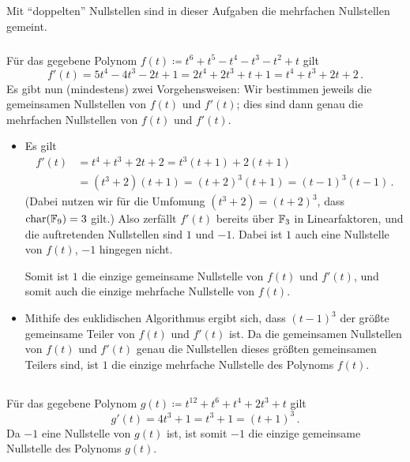 \subsection{}

Mit \enquote{doppelten} Nullstellen sind in dieser Aufgaben die mehrfachen Nullstellen gemeint.



\subsubsection{}

Für das gegebene Polynom $f(t) \coloneqq t^6 + t^5 - t^4 - t^3 - t^2 + t$ gilt
\[
    f'(t)
  = 5 t^4 - 4 t^3 - 2 t + 1
  = 2 t^4 + 2 t^3 + t + 1
  = t^4 + t^3 + 2 t + 2 \,.
\]
Es gibt nun (mindestens) zwei Vorgehensweisen:
Wir bestimmen jeweils die gemeinsamen Nullstellen von $f(t)$ und $f'(t)$;
dies sind dann genau die mehrfachen Nullstellen von $f(t)$ und $f'(t)$.

\begin{itemize}
  \item
    Es gilt
    \begin{align*}
          f'(t)
      &=  t^4 + t^3 + 2 t + 2
       =  t^3 (t+1) + 2 (t+1) \\
      &=  (t^3 + 2)(t + 1)
       =  (t + 2)^3 (t + 1)
       =  (t - 1)^3 (t - 1) \,.
    \end{align*}
    (Dabei nutzen wir für die Umfomung $(t^3 + 2) = (t+2)^3$, dass $\operatorname{char}(\mathbb{F}_{9}) = 3$ gilt.)
    Also zerfällt $f'(t)$ bereits über $\mathbb{F}_{3}$ in Linearfaktoren, und die auftretenden Nullstellen sind $1$ und $-1$.
    Dabei ist $1$ auch eine Nullstelle von $f(t)$, $-1$ hingegen nicht.
    
    Somit ist $1$ die einzige gemeinsame Nullstelle von $f(t)$ und $f'(t)$, und somit auch die einzige mehrfache Nullstelle von $f(t)$.
  \item
    Mithife des euklidischen Algorithmus ergibt sich, dass $(t-1)^3$ der größte gemeinsame Teiler von $f(t)$ und $f'(t)$ ist.
    Da die gemeinsamen Nullstellen von $f(t)$ und $f'(t)$ genau die Nullstellen dieses größten gemeinsamen Teilers sind, ist $1$ die einzige mehrfache Nullstelle des Polynoms $f(t)$.
\end{itemize}



\subsection{}

Für das gegebene Polynom $g(t) \coloneqq t^{12} + t^6 + t^4 + 2 t^3 + t$ gilt
\[
    g'(t)
  = 4 t^3 + 1
  = t^3 + 1
  = (t + 1)^3 \,.
\]
Da $-1$ eine Nullstelle von $g(t)$ ist, ist somit $-1$ die einzige gemeinsame Nullstelle des Polynoms $g(t)$.





